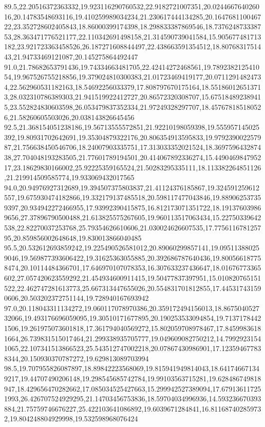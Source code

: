 \documentclass[handout,10pt,t,aspectratio=169]{beamer}
\begin{document}
{89.5,22.20516372363332,19.923116290760532,22.9182721007351,20.024466764026016,20.14783548693116,19.410259989034234,21.230617444134285,20.164768110046722,23.352728602405843,18.86000399174398,18.298833387869546,18.737624873338753,28.363471776521177,22.110342691498158,21.314590739041584,15.905677481713182,23.921723363458526,26.187271608844497,22.438663591354512,18.8076831751443,21.94733469121087,20.145275864492447
91.0,21.78682653791436,19.74334663481705,22.42414272468561,19.789238212541054,19.967526755218856,19.379024810300383,21.01723469419177,20.07112914824734,22.562960531182163,18.54692256033379,17.808797670175164,18.551860126513713,28.032310786389303,21.941519922412727,20.86572320308707,15.675184892389415,23.552824830603598,26.053479837352334,21.97249328297707,18.457678185180526,21.58260605503026,20.038143826645456
92.5,21.368154051238186,19.56713555572851,21.92210198059398,19.555957145025392,19.80931702642691,19.35304879322176,20.806354913595833,19.979239002257987,21.756638450546706,18.24007903335751,17.313033352021524,18.369759643287438,27.704048193283505,21.77601789194501,20.414067892336274,15.449046984795217,23.18629830166002,25.92225359165524,21.50283295335111,18.113382264851126,21.219914509585774,19.933069432017565
94.0,20.94976927312689,19.394507375803837,21.41124376185867,19.324591259612557,19.675930474182866,19.332179137485518,20.598117477043846,19.889062537359397,20.934942272466955,17.93992390415875,16.812173071351722,18.191376039869656,27.37896790500488,21.613825575267605,19.960113517063434,15.22750339642538,22.82270037253768,25.79354626610606,21.030024626607535,17.775611678125795,20.859856002648648,19.830013866040485
95.5,20.532612693859242,19.225490526581012,20.89060299857141,19.095113880259046,19.569877393606422,19.31625363055885,20.392686787640436,19.800566187758474,20.10114484366701,17.646970107078353,16.307633237436647,18.01676773365602,27.057420623559292,21.454934600911415,19.50477837397951,15.010820765151522,22.462747281613773,25.667313447655026,20.554831701812855,17.445317431590606,20.503202372751144,19.728940167693942
97.0,20.118043311134272,19.060117078970386,20.359172494156013,18.867504052732066,19.493176696059095,19.30510171677895,20.190253533094854,19.71371784421506,19.261975073601818,17.361794040569272,15.802059708978467,17.84599836181664,26.739831515017464,21.299338935705777,19.049609082750212,14.79929231541065,22.107341513866523,25.543512747002218,20.07867430986901,17.123594677838344,20.150930370787272,19.629813089703994
98.5,19.707955826087897,18.89842223568069,19.815941949814043,18.641746671349217,19.44707490206148,19.298545685742784,19.99103563715281,19.628486749818947,18.429656470282662,17.085034525427663,15.299942527389094,17.679136117251993,26.426707524929295,21.14703456753836,18.59704034996936,14.593236670393884,21.75759746676227,25.422103641086892,19.6039671284841,16.811687402859732,19.804248804929998,19.532598968076424
}
\end{document}
